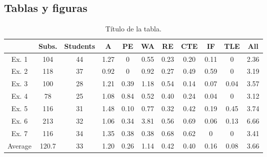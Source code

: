 \subsection{Tablas y figuras}

\begin{table}
  \centering
  \caption{Título de la tabla.}
  \label{tab:una_tabla}

\begin{footnotesize}
\renewcommand{\arraystretch}{1.5} %
\begin{tabular}{ccccccccccc}
  \hline
   & Subs. & Students & A & PE & WA & RE & CTE & IF & TLE & All\\
  \hline
Ex. 1 & 104 & 44 & 1.27    &   0       &   0.55    &   0.23    &   0.20    &   0.11    &   0     & 2.36  \\
Ex. 2 & 118 & 37 & 0.92    &   0       &   0.92    &   0.27    &   0.49    &   0.59    &   0     & 3.19  \\
Ex. 3 & 100 & 28 & 1.21    &   0.39    &   1.18    &   0.54    &   0.14    &   0.07    &   0.04  & 3.57  \\
Ex. 4 & 78  & 25 & 1.08    &   0.84    &   0.52    &   0.40    &   0.24    &   0.04    &   0     & 3.12  \\
Ex. 5 & 116 & 31 & 1.48    &   0.10    &   0.77    &   0.32    &   0.42    &   0.19    &   0.45  & 3.74  \\
Ex. 6 & 213 & 32 & 1.06    &   0.34    &   3.81    &   0.56    &   0.69    &   0.06    &   0.13  & 6.66  \\
Ex. 7 & 116 & 34 & 1.35    &   0.38    &   0.38    &   0.68    &   0.62    &   0       &   0     & 3.41  \\
  \hline
Average & 120.7 & 33 & 1.20 &  0.26 &  1.14 &  0.42 &  0.40 &  0.16 &  0.08 & 3.66 \\
  \hline
 \end{tabular}
\end{footnotesize}

\end{table}









